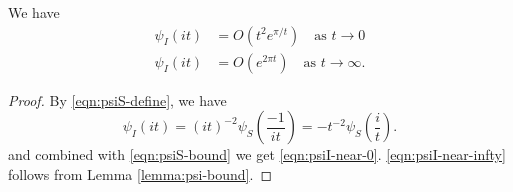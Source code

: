 
\begin{corollary}\label{cor:psiI-near-0-infty}
We have
\begin{align}
    \psi_I(it) &= O(t^2 e^{\pi/t}) \quad \text{as } t \to 0 \label{eqn:psiI-near-0} \\
    \psi_I(it) &= O(e^{2 \pi t}) \quad \text{as } t \to \infty. \label{eqn:psiI-near-infty}
\end{align}
\end{corollary}
\begin{proof}
By \eqref{eqn:psiS-define}, we have
\begin{equation}
    \psi_I(it) = (it)^{-2} \psi_S\left(\frac{-1}{it}\right) = -t^{-2} \psi_S\left(\frac{i}{t}\right).
\end{equation}
and combined with \eqref{eqn:psiS-bound} we get \eqref{eqn:psiI-near-0}.
\eqref{eqn:psiI-near-infty} follows from Lemma \ref{lemma:psi-bound}.
\end{proof}

